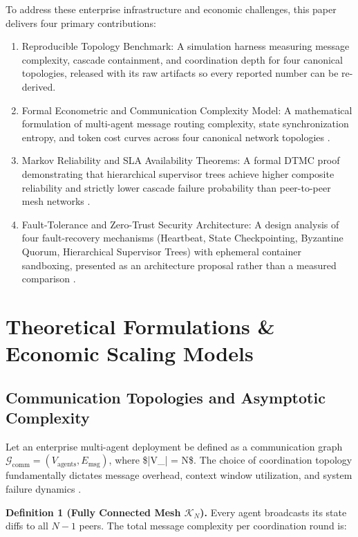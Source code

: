 \documentclass{article}
\begin{document}
To address these enterprise infrastructure and economic challenges, this paper delivers four primary contributions:
\begin{enumerate}
  \item Reproducible Topology Benchmark: A simulation harness measuring message complexity, cascade containment, and coordination depth for four canonical topologies, released with its raw artifacts so every reported number can be re-derived.
  \item Formal Econometric and Communication Complexity Model: A mathematical formulation of multi-agent message routing complexity, state synchronization entropy, and token cost curves across four canonical network topologies \cite{arxiv_2404_01131,arxiv_2203_08975}.
  \item Markov Reliability and SLA Availability Theorems: A formal DTMC proof demonstrating that hierarchical supervisor trees achieve higher composite reliability and strictly lower cascade failure probability than peer-to-peer mesh networks \cite{arxiv_2010_11146,arxiv_2412_06333}.
  \item Fault-Tolerance and Zero-Trust Security Architecture: A design analysis of four fault-recovery mechanisms (Heartbeat, State Checkpointing, Byzantine Quorum, Hierarchical Supervisor Trees) with ephemeral container sandboxing, presented as an architecture proposal rather than a measured comparison \cite{arxiv_2404_04289,openalex_w4400578758}.
\end{enumerate}




\section{Theoretical Formulations \& Economic Scaling Models}



\subsection{Communication Topologies and Asymptotic Complexity}


Let an enterprise multi-agent deployment be defined as a communication graph $\mathcal{G}_{\text{comm}} = (V_{\text{agents}}, E_{\text{msg}})$, where \$|V\_{}| = N\$. The choice of coordination topology fundamentally dictates message overhead, context window utilization, and system failure dynamics \cite{arxiv_2203_08975}.

\textbf{Definition 1 (Fully Connected Mesh $\mathcal{K}_N$).} Every agent broadcasts its state diffs to all $N-1$ peers. The total message complexity per coordination round is:
\end{document}
